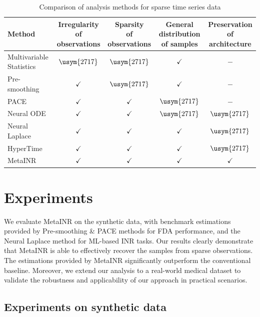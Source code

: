 \documentclass{article}
\newcommand{\xmark}{\usym{2717}}
\begin{document}
\begin{table}[htb]
  \centering
\begin{tabular}{lcccc}
  \hline 
  Method & \thead{Irregularity\\of observations} & \thead{Sparsity \\of observations} & \thead{General distribution \\ of samples} & \thead{Preservation \\ of architecture} \\
  \hline  
  Multivariable Statistics& $\xmark$ & $\xmark$ & $\checkmark$ & $-$\\
  Pre-smoothing & $\checkmark$ & $\xmark$ & $\checkmark$ & $-$\\
  PACE \cite{yao2005functional} & $\checkmark$ & $\checkmark$ & $\xmark$& $-$  \\
  Neural ODE \cite{chen2018neural} & $\checkmark$ & $\checkmark$ & $\xmark$ & $\xmark$ \\
  Neural Laplace \cite{holt2022neural} & $\checkmark$ & $\checkmark$ & $\checkmark$ & $\xmark$ \\
  HyperTime \cite{fons2022hypertime} & $\checkmark$ & $\checkmark$ & $\checkmark$ & $\xmark$ \\
  MetaINR & $\checkmark$ & $\checkmark$ &$\checkmark$ & $\checkmark$\\
 \hline
\end{tabular}
\caption{Comparison of analysis methods for sparse time series data}
\label{method_compare}
\end{table}




\section{Experiments}
We evaluate MetaINR on the synthetic data, with benchmark estimations provided by Pre-smoothing \& PACE methods for FDA performance, and the Neural Laplace method for ML-based INR tasks.
Our results clearly demonstrate that MetaINR is able to effectively recover the samples from sparse observations. The estimations provided by MetaINR significantly outperform the conventional baseline. 
Moreover, we extend our analysis to a real-world medical dataset to validate the robustness and applicability of our approach in practical scenarios.
\subsection{Experiments on synthetic data}
\end{document}
